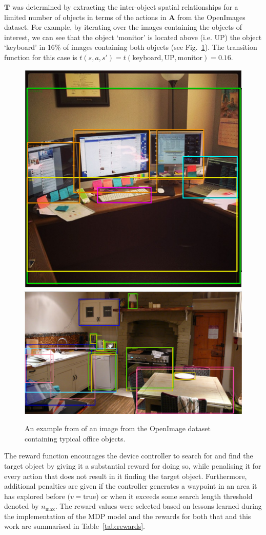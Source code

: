 \documentclass[runningheads]{llncs}
\begin{document}
$\mathbf{T}$ was determined by extracting the inter-object spatial relationships for a limited number of objects in terms of the actions in $\mathbf{A}$ from the OpenImages~\cite{openimages} dataset. 
For example, by iterating over the images containing the objects of interest, we can see that the object `monitor' is located above (i.e. UP) the object `keyboard' in 16\% of images containing both objects (see Fig.~\ref{fig:openimage}). 
The transition function for this case is $t(s, a, s') = t(\textrm{keyboard}, \textrm{UP}, \textrm{monitor}) = 0.16$.

\begin{figure}[t]
  \centering
  \includegraphics[width=0.35\columnwidth]{figures/desk_example.png} \hfil
  \includegraphics[width=0.55\columnwidth]{figures/kitchen_example_thicc.png}
  \caption{An example from of an image from the OpenImage dataset~\cite{openimages} containing typical office objects.}\label{fig:openimage}
\end{figure}

The reward function encourages the device controller to search for and find the target object by giving it a substantial reward for doing so, while penalising it for every action that does not result in it finding the target object.
Furthermore, additional penalties are given if the controller generates a waypoint in an area it has explored before $(v = \textrm{true}$) or when it exceeds some search length threshold denoted by $n_{\max}$.
The reward values were selected based on lessons learned during the implementation of the MDP model and the rewards for both that and this work are summarised in Table~\ref{tab:rewards}.
\end{document}

